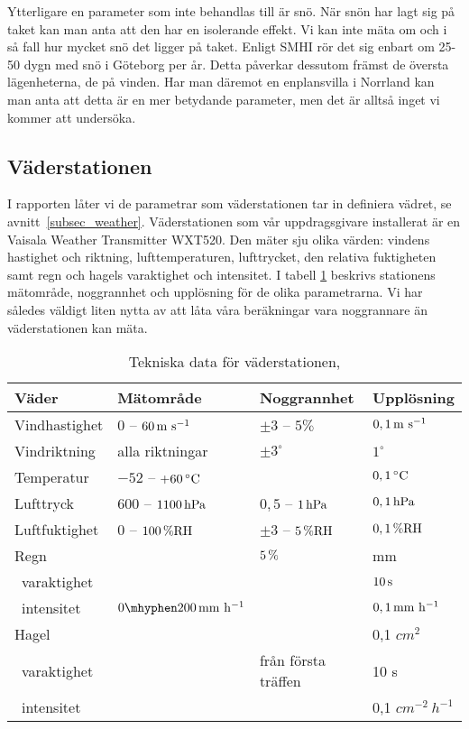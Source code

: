 Ytterligare en parameter som inte behandlas till är snö. När snön har lagt sig på taket kan man anta att den har en isolerande effekt. Vi kan inte mäta om och i så fall hur mycket snö det ligger på taket. Enligt SMHI\cite{SMHIdata}
rör det sig enbart om 25-50 dygn med snö i Göteborg per år. Detta påverkar dessutom främst de översta lägenheterna, de på vinden. Har man däremot en enplansvilla i Norrland kan man anta att detta är en mer betydande parameter, men det är alltså inget vi kommer att undersöka.

\subsection{Väderstationen}
\label{subsec_weathertransmitter}
I rapporten låter vi de parametrar som väderstationen tar in definiera vädret, se avnitt~\ref{subsec_weather}. Väderstationen som vår uppdragsgivare installerat är en Vaisala Weather Transmitter WXT520. Den mäter sju olika värden: vindens hastighet och riktning, lufttemperaturen, lufttrycket, den relativa fuktigheten samt regn och hagels varaktighet och intensitet. I tabell \ref{tbl:weathertransmitter} beskrivs stationens mätområde, noggrannhet och upplösning för de olika parametrarna. Vi har således väldigt liten nytta av att låta våra beräkningar vara noggrannare än väderstationen kan mäta.

\begin{table}[htdp]
\caption{Tekniska data för väderstationen, \cite{datasheet_weathertransmitter}}

\begin{center}
\begin{tabular}{|l | l l l|}
\hline
\textbf{Väder} & \textbf{Mätområde} %
 & \textbf{Noggrannhet} %
 & \textbf{Upplösning} \\ %
\hline
\rule{0pt}{3ex}Vindhastighet & $0$ -- $\unit[60]{m~s^{-1}}$ & $\pm3$ -- $5\%$ & $\unit[0,1]{m~s^{-1}}$ \\ 
\rule{0pt}{3ex}Vindriktning & alla riktningar & $\pm 3^{\circ}$ & $1^{\circ}$ \\
\rule{0pt}{3ex}Temperatur & $-52$ -- $\unit[+60]{^{\circ}C}$ & & $\unit[0,1]{^{\circ}C}$ \\
\rule{0pt}{3ex}Lufttryck & $600$ -- $\unit[1100]{hPa}$ & $0,5$ -- $\unit[1]{hPa}$ & $\unit[0,1]{hPa}$ \\
\rule{0pt}{3ex}Luftfuktighet & $0$ -- $\unit[100]{\%RH}$ & $\pm3$ -- $\unit[ 5]{\%RH}$ & $\unit[0,1]{\%RH}$ \\
\rule{0pt}{3ex}Regn &  & $\unit[5]{\%}$ & \unit[0,01]{mm} \\
~varaktighet & & & $\unit[10]{s}$\\
~intensitet & $\unit[0\mhyphen 200]{mm~h^{-1}}$ & & $\unit[0,1]{mm~h^{-1}}$ \\
\rule{0pt}{3ex}Hagel &  &  & 0,1 $\unit{cm^2}$ \\
~varaktighet & & från första träffen & 10 s\\
~intensitet & & & 0,1 $\unit{cm^{-2}~h^{-1}}$\\
\hline
\end{tabular}
\end{center}
\label{tbl:weathertransmitter}
\end{table}

